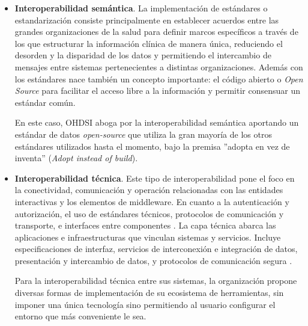 \begin{itemize}

    \item \textbf{Interoperabilidad semántica}. La implementación de estándares o estandarización consiste principalmente en establecer acuerdos entre las grandes organizaciones de la salud para definir marcos específicos a través de los que estructurar la información clínica de manera única, reduciendo el desorden y la disparidad de los datos y permitiendo el intercambio de mensajes entre sistemas pertenecientes a distintas organizaciones. 
    Además con los estándares nace también un concepto importante: el código abierto o \textit{Open Source} para facilitar el acceso libre a la información y permitir consensuar un estándar común.

   En este caso, OHDSI aboga por la interoperabilidad semántica aportando un estándar de datos \textit{open-source} que utiliza la gran mayoría de los otros estándares utilizados hasta el momento, bajo la premisa ''adopta en vez de inventa'' (\textit{Adopt instead of build}).

    \item \textbf{Interoperabilidad técnica}. Este tipo de interoperabilidad pone el foco en la conectividad, comunicación y operación relacionadas con las entidades interactivas y los elementos de middleware. En cuanto a la autenticación y autorización, el uso de estándares técnicos, protocolos de comunicación y transporte, e interfaces entre componentes \cite{santos2021interoperability}. La capa técnica abarca las aplicaciones e infraestructuras que vinculan sistemas y servicios. Incluye especificaciones de interfaz, servicios de interconexión e integración de datos, presentación y intercambio de datos, y protocolos de comunicación segura \cite{leal2019interoperability}.

    Para la interoperabilidad técnica entre sus sistemas, la organización propone diversas formas de implementación de su ecosistema de herramientas, sin imponer una única tecnología sino permitiendo al usuario configurar el entorno que más conveniente le sea.
    

\end{itemize}
